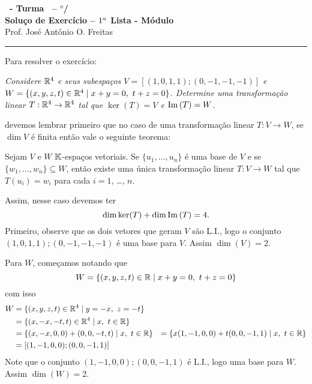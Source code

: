 \documentclass[12pt]{exam}
\begin{document}
    \begin{center}
        {\Large\bf \disciplina\ - Turma \turma\ -- \semestre$^{o}$/\ano} \\ \vspace{9pt} {\large\bf
            Solu\c{c}o de Exercício -- $1^a$ Lista - Módulo \numeromodulo}\\ \vspace{9pt} Prof. José Antônio O. Freitas
    \end{center}
    \hrule

    Para resolver o exercício:
    \begin{center}
        \begin{flushleft}
            \textit{Considere $\mathbb{R}^4$ e seus subespa\c{c}os $V = [(1,0,1,1);(0,-1,-1,-1)]$ e $W = \{(x,y,z,t) \in \mathbb{R}^4 \mid x + y = 0,\ t + z = 0\}$. Determine uma transforma\c{c}ão linear $T : \mathbb{R}^4 \to \mathbb{R}^4$ tal que $\ker(T) = V$ e ${\rm Im\,}(T) = W$.}
         \end{flushleft}
    \end{center}
    devemos lembrar primeiro que no caso de uma transforma\c{c}ão linear $T \colon V \to W$, se $\dim V$ é finita então vale o seguinte teorema:

    \begin{tcolorbox}[colback=green!30, colframe=green!80!blue, title=Teorema]
        Sejam $V$ e $W$ $\mathbb{K}$-espa\c{c}os vetoriais. Se $\{u_1, \dots, u_n\}$ é uma base de $V$ e se $\{w_1, \dots, w_n\} \subseteq W$, então existe uma única transforma\c{c}ão linear $T \colon V \to W$ tal que $T(u_i) = w_i$ para cada $i = 1$, \dots, $n$.
    \end{tcolorbox}

    Assim, nesse caso devemos ter
    \[
        \dim\ker(T) + \dim{\rm Im\,}(T) = 4.
    \]
    Primeiro, observe que os dois vetores que geram $V$ são L.I., logo o conjunto ${(1, 0, 1, 1); (0,-1,-1,-1)}$ é uma base para $V$. Assim $\dim(V) = 2$.

    Para $W$, come\c{c}amos notando que
    \[
        W = \{(x, y, z, t) \in \mathbb{R} \mid x + y = 0,\ t + z = 0\}
    \]
    com isso
    \begin{align*}
        W &= \{(x, y, z, t) \in \mathbb{R}^4 \mid y = -x,\ z = -t\} \\ &= \{(x, -x, -t, t) \in \mathbb{R}^4 \mid x,\ t \in \mathbb{R}\} \\ &= \{(x, -x, 0, 0) + (0, 0, -t, t) \mid x,\ t \in \mathbb{R}\} &= \{x(1, -1, 0, 0) + t(0, 0, -1, 1) \mid x,\ t \in \mathbb{R}\} \\ &= [(1, -1, 0, 0); (0, 0, -1, 1)]
    \end{align*}
    Note que o conjunto ${(1, -1, 0, 0); (0, 0, -1, 1)}$ é L.I., logo uma base para $W$. Assim $\dim(W) = 2$.
\end{document}
